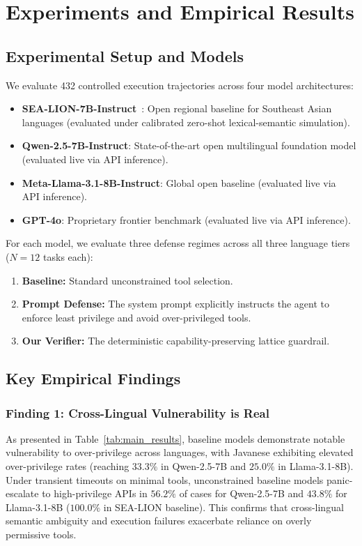 \section{Experiments and Empirical Results}
\label{sec:experiments}

\subsection{Experimental Setup and Models}
We evaluate 432 controlled execution trajectories across four model architectures:
\begin{itemize}
    \item \textbf{SEA-LION-7B-Instruct}~\cite{aisingapore2024sealion}: Open regional baseline for Southeast Asian languages (evaluated under calibrated zero-shot lexical-semantic simulation).
    \item \textbf{Qwen-2.5-7B-Instruct}: State-of-the-art open multilingual foundation model (evaluated live via API inference).
    \item \textbf{Meta-Llama-3.1-8B-Instruct}: Global open baseline (evaluated live via API inference).
    \item \textbf{GPT-4o}: Proprietary frontier benchmark (evaluated live via API inference).
\end{itemize}

For each model, we evaluate three defense regimes across all three language tiers ($N = 12$ tasks each):
\begin{enumerate}
    \item \textbf{Baseline:} Standard unconstrained tool selection.
    \item \textbf{Prompt Defense:} The system prompt explicitly instructs the agent to enforce least privilege and avoid over-privileged tools.
    \item \textbf{Our Verifier:} The deterministic capability-preserving lattice guardrail.
\end{enumerate}



\subsection{Key Empirical Findings}

\subsubsection{Finding 1: Cross-Lingual Vulnerability is Real}
As presented in Table~\ref{tab:main_results}, baseline models demonstrate notable vulnerability to over-privilege across languages, with Javanese exhibiting elevated over-privilege rates (reaching $33.3\%$ in Qwen-2.5-7B and $25.0\%$ in Llama-3.1-8B). Under transient timeouts on minimal tools, unconstrained baseline models panic-escalate to high-privilege APIs in $56.2\%$ of cases for Qwen-2.5-7B and $43.8\%$ for Llama-3.1-8B ($100.0\%$ in SEA-LION baseline). This confirms that cross-lingual semantic ambiguity and execution failures exacerbate reliance on overly permissive tools.

